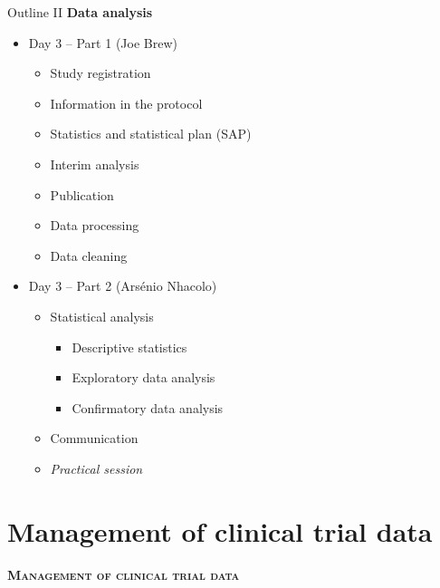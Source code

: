 \documentclass[xcolor=dvipsnames,11pt]{beamer}
\begin{document}
\begin{frame}{Outline II}{}
	\textbf{Data analysis}\\
	\begin{itemize}
		\item[] Day 3 -- Part 1 (Joe Brew)
		\begin{itemize}
			\item Study registration
			\item Information in the protocol
			\item Statistics and statistical plan (SAP)
			\item Interim analysis
			\item Publication
			\item Data processing
			\item Data cleaning
		\end{itemize}
		\item[] Day 3 -- Part 2 (Ars\'enio Nhacolo)
		\begin{itemize}
			\item Statistical analysis
			\begin{itemize}
				\item Descriptive statistics
				\item Exploratory data analysis
				\item Confirmatory data analysis
			\end{itemize}
			\item Communication
			\item \textit{Practical session}
		\end{itemize}		
	\end{itemize}			
\end{frame}	

\section{Management of clinical trial data}

\begin{frame}[fragile]{}{}
	\begin{center}
		\textbf{\textsc{Management of clinical trial data}}
	\end{center}
\end{frame}
\end{document}
